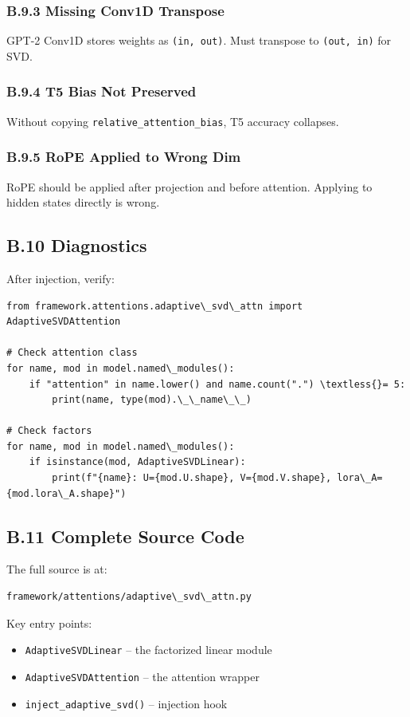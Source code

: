 \subsubsection{B.9.3 Missing Conv1D Transpose}

GPT-2 Conv1D stores weights as \texttt{(in, out)}. Must transpose to \texttt{(out, in)} 
for SVD.

\subsubsection{B.9.4 T5 Bias Not Preserved}

Without copying \texttt{relative\_attention\_bias}, T5 accuracy collapses.

\subsubsection{B.9.5 RoPE Applied to Wrong Dim}

RoPE should be applied after projection and before attention. Applying to 
hidden states directly is wrong.

\subsection{B.10 Diagnostics}

After injection, verify:

\begin{lstlisting}
from framework.attentions.adaptive\_svd\_attn import AdaptiveSVDAttention

# Check attention class
for name, mod in model.named\_modules():
    if "attention" in name.lower() and name.count(".") \textless{}= 5:
        print(name, type(mod).\_\_name\_\_)

# Check factors
for name, mod in model.named\_modules():
    if isinstance(mod, AdaptiveSVDLinear):
        print(f"{name}: U={mod.U.shape}, V={mod.V.shape}, lora\_A={mod.lora\_A.shape}")
\end{lstlisting}

\subsection{B.11 Complete Source Code}

The full source is at:

\begin{lstlisting}
framework/attentions/adaptive\_svd\_attn.py
\end{lstlisting}

Key entry points:
\begin{itemize}
\item \texttt{AdaptiveSVDLinear} -- the factorized linear module
\item \texttt{AdaptiveSVDAttention} -- the attention wrapper
\item \texttt{inject\_adaptive\_svd()} -- injection hook
\end{itemize}